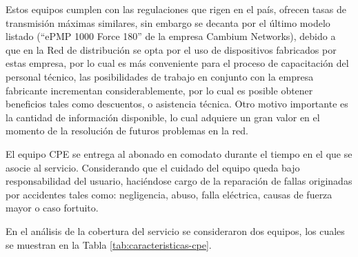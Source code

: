 
Estos equipos cumplen con las regulaciones que rigen en el país, ofrecen tasas de transmisión máximas similares, sin embargo se decanta por el último modelo listado (“ePMP 1000 Force 180” de la empresa Cambium Networks), debido a que en la Red de distribución se opta por el uso de dispositivos fabricados por estas empresa, por lo cual es más conveniente para el proceso de capacitación del personal técnico, las posibilidades de trabajo en conjunto con la empresa fabricante incrementan considerablemente, por lo cual es posible obtener beneficios tales como descuentos, o asistencia técnica. Otro motivo importante es la cantidad de información disponible, lo cual adquiere un gran valor en el momento de la resolución de futuros problemas en la red.



El equipo CPE se entrega al abonado en comodato durante el tiempo en el que se asocie al servicio. Considerando que el cuidado del equipo queda bajo responsabilidad del usuario, haciéndose cargo de la reparación de fallas originadas por accidentes tales como: negligencia, abuso, falla eléctrica, causas de fuerza mayor o caso fortuito.

En el análisis de la cobertura del servicio se consideraron dos equipos, los cuales se muestran en la Tabla \ref{tab:caracteristicas-cpe}.


